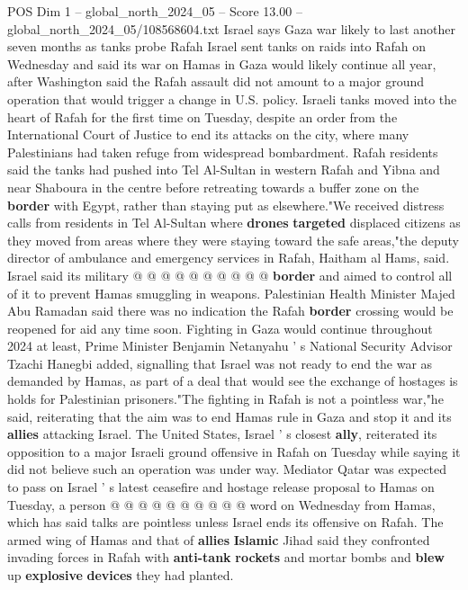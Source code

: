 \begin{textsample}{POS Dim 1 – global\_north\_2024\_05 – Score 13.00 – global\_north\_2024\_05/108568604.txt}  \label{ex:f1_pos_410}
Israel says Gaza war likely to last another seven months as tanks probe Rafah Israel sent tanks on raids into Rafah on Wednesday and said its war on Hamas in Gaza would likely continue all year, after Washington said the Rafah assault did not amount to a major ground operation that would trigger a change in U.S. policy.
Israeli tanks moved into the heart of Rafah for the first time on Tuesday, despite an order from the International Court of Justice to end its attacks on the city, where many Palestinians had taken refuge from widespread bombardment.
Rafah residents said the tanks had pushed into Tel Al-Sultan in western Rafah and Yibna and near Shaboura in the centre before retreating towards a buffer zone on the \textbf{border} with Egypt, rather than staying put as elsewhere."We received distress calls from residents in Tel Al-Sultan where \textbf{drones} \textbf{targeted} displaced citizens as they moved from areas where they were staying toward the safe areas,"the deputy director of ambulance and emergency services in Rafah, Haitham al Hams, said.
Israel said its military @ @ @ @ @ @ @ @ @ @ \textbf{border} and aimed to control all of it to prevent Hamas smuggling in weapons.
Palestinian Health Minister Majed Abu Ramadan said there was no indication the Rafah \textbf{border} crossing would be reopened for aid any time soon.
Fighting in Gaza would continue throughout 2024 at least, Prime Minister Benjamin Netanyahu ' s National Security Advisor Tzachi Hanegbi added, signalling that Israel was not ready to end the war as demanded by Hamas, as part of a deal that would see the exchange of hostages is holds for Palestinian prisoners."The fighting in Rafah is not a pointless war,"he said, reiterating that the aim was to end Hamas rule in Gaza and stop it and its \textbf{allies} attacking Israel.
The United States, Israel ' s closest \textbf{ally}, reiterated its opposition to a major Israeli ground offensive in Rafah on Tuesday while saying it did not believe such an operation was under way.
Mediator Qatar was expected to pass on Israel ' s latest ceasefire and hostage release proposal to Hamas on Tuesday, a person @ @ @ @ @ @ @ @ @ @ word on Wednesday from Hamas, which has said talks are pointless unless Israel ends its offensive on Rafah.
The armed wing of Hamas and that of \textbf{allies} \textbf{Islamic} Jihad said they confronted invading forces in Rafah with \textbf{anti-tank} \textbf{rockets} and mortar bombs and \textbf{blew} up \textbf{explosive} \textbf{devices} they had planted.

\end{textsample}
